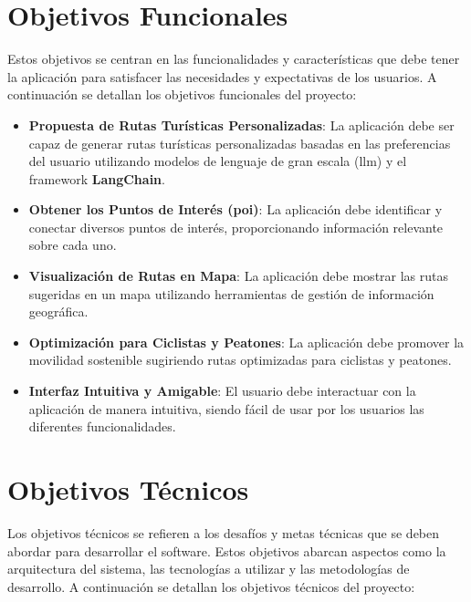 
\section{Objetivos Funcionales}

Estos objetivos se centran en las funcionalidades y características que debe tener la aplicación para satisfacer las necesidades y expectativas de los usuarios. A continuación se detallan los objetivos funcionales del proyecto:

\begin{itemize}
    \item \textbf{Propuesta de Rutas Turísticas Personalizadas}: La aplicación debe ser capaz de generar rutas turísticas personalizadas basadas en las preferencias del usuario utilizando modelos de lenguaje de gran escala (\acrfull{llm}) y el framework \textbf{LangChain}.
    \item \textbf{Obtener los Puntos de Interés (\acrfull{poi})}: La aplicación debe identificar y conectar diversos puntos de interés, proporcionando información relevante sobre cada uno.
    \item \textbf{Visualización de Rutas en Mapa}: La aplicación debe mostrar las rutas sugeridas en un mapa utilizando herramientas de gestión de información geográfica.
    \item \textbf{Optimización para Ciclistas y Peatones}: La aplicación debe promover la movilidad sostenible sugiriendo rutas optimizadas para ciclistas y peatones.
    \item \textbf{Interfaz Intuitiva y Amigable}: El usuario debe interactuar con la aplicación de manera intuitiva, siendo fácil de usar por los usuarios las diferentes funcionalidades.
\end{itemize}

\section{Objetivos Técnicos}

Los objetivos técnicos se refieren a los desafíos y metas técnicas que se deben abordar para desarrollar el software. Estos objetivos abarcan aspectos como la arquitectura del sistema, las tecnologías a utilizar y las metodologías de desarrollo. A continuación se detallan los objetivos técnicos del proyecto:


